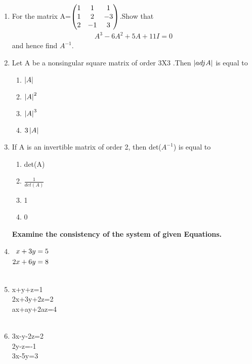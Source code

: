 \documentclass[journal,12pt,twocolumn]{IEEEtran}
\renewcommand\thesection{\arabic{section}}
\begin{document}
\begin{enumerate}[label=\thesection.\arabic*.,ref=\thesection.\theenumi]
\item For the matrix A=$\begin{pmatrix} 1&1&1 \\ 1&2&-3 \\ 2&-1&3\end{pmatrix}$.Show that \begin{align}
    A^3-6A^2+5A+11I=0\label{eq:det/49/1}
\end{align} and hence find $A^{-1}$.
\solution 

\item Let A be a nonsingular square matrix of order 3X3 .Then $\left\vert adjA\right\vert$ is equal to 
\begin{enumerate}
\item $\left\vert A\right\vert$
\item $\left\vert A\right\vert^2$
\item $\left\vert A\right\vert^3$
\item $3\left\vert A\right\vert$
\end{enumerate}
\item If A is an invertible matrix of order 2, then det($A^{-1}$) is equal to 
\begin{enumerate}
\item det(A)
\item $\frac{1}{det(A)}$
\item 1
\item 0
\end{enumerate}
\textbf{Examine the consistency of the system of given Equations.}
\item $\begin{alignedat}[t]{2}
x+3y&=5 
\\
2x+6y&=8 
\end{alignedat}$\\
\\
\solution 

\item x+y+z=1\\ 2x+3y+2z=2\\ax+ay+2az=4\\
\\
\solution 

\item 3x-y-2z=2 \\ 2y-z=-1 \\ 3x-5y=3\\

\end{enumerate}
\end{document}
